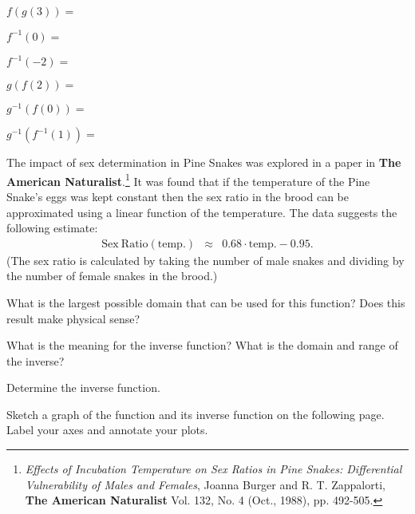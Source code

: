 \begin{problem}
  \begin{subproblem}
    \item $f(g(3)) =$
      \vfill
    \item $f^{-1}(0) =$
      \vfill
    \item $f^{-1}(-2) = $
      \vfill
    \item $g(f(2)) = $
      \vfill
    \item $g^{-1}(f(0)) = $
      \vfill
    \item $g^{-1}(f^{-1}(1)) = $
      \vfill
  \end{subproblem}

\clearpage

\item The impact of sex determination in Pine Snakes was explored in a
  paper in \textbf{The American Naturalist}.\footnote{\textit{Effects
      of Incubation Temperature on Sex Ratios in Pine Snakes:
      Differential Vulnerability of Males and Females}, Joanna Burger
    and R. T. Zappalorti, \textbf{The American Naturalist} Vol. 132,
    No. 4 (Oct., 1988), pp. 492-505.} It was found that if the
  temperature of the Pine Snake's eggs was kept constant then the
  sex ratio in the brood can be approximated using a linear function
  of the temperature. The data suggests the following estimate:
  \begin{eqnarray*}
    \mathrm{Sex~Ratio(temp.)} & \approx & 0.68\cdot\mathrm{temp.}-0.95.
  \end{eqnarray*}
  (The sex ratio is calculated by taking the number of male snakes and
  dividing by the number of female snakes in the brood.)

  \begin{subproblem}
  \item What is the largest possible domain that can be used for this
    function? Does this result make physical sense?
    \vfill
  \item What is the meaning for the inverse function? What is the
    domain and range of the inverse?
    \vfill
  \item Determine the inverse function.
    \vfill
  \item Sketch a graph of the function and its inverse function on the
    following page. Label your axes and annotate your plots.  
  \end{subproblem}

\end{problem}

\postClass

